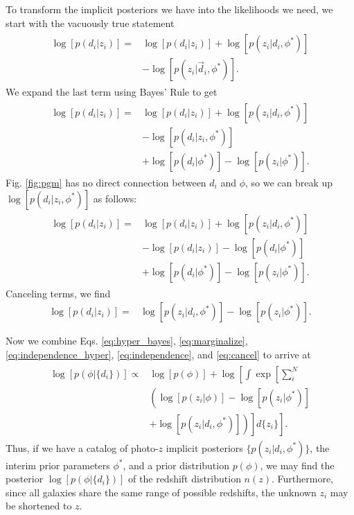 \documentclass[iop]{emulateapj}
\begin{document}
\begin{appendices}
To transform the implicit posteriors we have into the likelihoods we need, we start with the vacuously true statement
\begin{align}
\begin{split}
\label{eq:unity}
\log[p(d_{i} | z_{i})] =& \log[p(d_{i} | z_{i})] + \log[p(z_{i} | d_{i}, \phi^{*})]\\
& - \log[p(z_{i} | \vec{d}_{i}, \phi^{*})] .
\end{split}
\end{align}
We expand the last term using Bayes' Rule to get
\begin{align}
\begin{split}
\label{eq:bayes}
\log[p(d_{i} | z_{i})] =& \log[p(d_{i} | z_{i})] + \log[p(z_{i} | d_{i}, \phi^{*})]\\
& - \log[p(d_{i} | z_{i}, \phi^{*})]\\
& + \log[p(d_{i} | \phi^{*})] - \log[p(z_{i} | \phi^{*})] .
\end{split}
\end{align}
Fig. \ref{fig:pgm} has no direct connection between $d_{i}$ and $\phi$, so we can break up $\log[p(d_{i} | z_{i}, \phi^{*})]$ as follows:
\begin{align}
\begin{split}
\label{eq:split}
\log[p(d_{i} | z_{i})] =& \log[p(d_{i} | z_{i})] + \log[p(z_{i} | d_{i}, \phi^{*})]\\
& - \log[p(d_{i} | z_{i})] - \log[p(d_{i} | \phi^{*})]\\
& + \log[p(d_{i} | \phi^{*})] - \log[p(z_{i} | \phi^{*})] .
\end{split}
\end{align}
Canceling terms, we find
\begin{align}
\label{eq:cancel}
\log[p(d_{i} | z_{i})] =& \log[p(z_{i} | d_{i}, \phi^{*})] - \log[p(z_{i} | \phi^{*})].
\end{align}

Now we combine Eqs. \ref{eq:hyper_bayes}, \ref{eq:marginalize}, \ref{eq:independence_hyper}, \ref{eq:independence}, and \ref{eq:cancel} to arrive at 
\begin{align}
\begin{split}
\label{eq:final}
\log[p(\phi | \{d_{i}\})] \propto& \log[p(\phi)] + \log\left[\int \exp\left[\sum_{i}^{N} \right.\right.\\
& \left.\left.\left(\log[p(z_{i} | \phi)] - \log[p(z_{i} | \phi^{*})]\right.\right.\right.\\
& \left.\left.\left. + \log[p(z_{i} | d_{i}, \phi^{*})]
\right)\right] d\{z_{i}\}\right].
\end{split}
\end{align}
Thus, if we have a catalog of photo-$z$ implicit posteriors $\{p(z_{i} | d_{i}, \phi^{*})\}$, the interim prior parameters $\phi^{*}$, and a prior distribution $p(\phi)$, we may find the posterior $\log[p(\phi | \{d_{i}\})]$ of the redshift distribution $n(z)$.
Furthermore, since all galaxies share the same range of possible redshifts, the unknown $z_{i}$ may be shortened to $z$.


\end{appendices}
\end{document}
